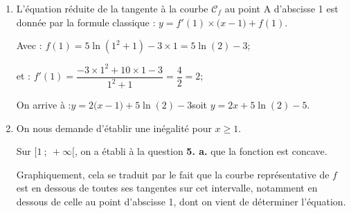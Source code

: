 \documentclass[10pt]{article}
\begin{document}
\begin{enumerate}
\begin{enumerate}
$f$ est donc convexe sur $[-1 ; 1]$, et concave sur $]-\infty ; -1]$ ainsi que sur $[1 ; +\infty[$, avec deux points d'inflexion, à l'abscisse $-1$ et à l'abscisse 1(c'est le point A).

Cela permet donc de rejeter la conjecture formulée à la question \textbf{1.}. Cette conjecture est faussée par l'échelle choisie pour la représentation de $f$. Ci-après, avec une échelle qui permet d'observer les images pour des abscisses inférieures à 1, la concavité de cette zone devient apparente :

\hfill~\hfill~

	\item L'équation réduite de la tangente à la courbe $\mathcal{C}_{f}$ au point A d'abscisse 1 est donnée par la formule classique :
\quad $y = f'(1) \times \big(x - 1\big) + f(1)$.

Avec : \quad $f(1) = 5\ln(1^2 + 1) - 3\times 1 = 5\ln(2) - 3$;

et : \quad $f'(1) = \dfrac{-3\times 1^2 + 10 \times 1 - 3}{1^2 + 1} = \dfrac{4}{2} = 2$;

On arrive à :\quad $y = 2\big(x - 1\big) + 5\ln(2) - 3$\quad soit  \quad $y = 2x + 5\ln(2) - 5$.

	\item On nous demande d'établir une inégalité pour $x \geqslant 1$.

Sur $[1~;~+\infty[$, on a établi à la question \textbf{5. a.} que la fonction est concave.

Graphiquement, cela se traduit par le fait que la courbe représentative de $f$ est en dessous de toutes ses tangentes sur cet intervalle, notamment en dessous de celle au point d'abscisse 1, dont on vient de déterminer l'équation.


\end{enumerate}
\end{enumerate}
\end{document}
